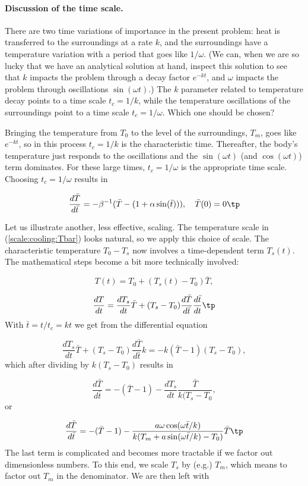 \documentclass[graybox,envcountchap,sectrefs,final]{svmonodo}
\begin{document}
\paragraph{Discussion of the time scale.}
There are two time variations of importance in the present problem:
heat is transferred to the surroundings at a rate $k$, and the
surroundings have a temperature variation with a period that goes like
$1/\omega$. (We can, when we are so lucky that we have an analytical
solution at hand, inspect this solution to see that $k$ impacts the
problem through a decay factor $e^{-kt}$, and $\omega$ impacts the problem
through oscillations $\sin(\omega t)$.)  The $k$ parameter related to
temperature decay points to a time scale $t_c=1/k$, while the
temperature oscillations of the surroundings point to a time scale
$t_c=1/\omega$.  Which one should be chosen?

Bringing the temperature from $T_0$ to the level of the surroundings,
$T_m$, goes like $e^{-kt}$, so in this process $t_c=1/k$ is the
characteristic time. Thereafter, the body's temperature just responds
to the oscillations and the $\sin (\omega t)$ (and $\cos(\omega t)$)
term dominates. For these large times, $t_c=1/\omega$ is the
appropriate time scale. Choosing $t_c=1/\omega$ results in

\begin{equation}
\frac{d\bar T}{d\bar t} = -\beta^{-1}(\bar T - (1 + \alpha\sin (\bar t))),\quad
\bar T(0)=0\tp
\label{scale:cooling:model:scaled2}
\end{equation}


Let us illustrate another, less effective, scaling.
The temperature scale in
(\ref{scale:cooling:Tbar}) looks natural, so we apply this
choice of scale. The characteristic temperature $T_0-T_s$
now involves
a time-dependent term $T_s(t)$. The mathematical steps become a bit
more technically involved:

\[ T(t) = T_0 + (T_s(t)-T_0)\bar T,\]

\[ \frac{dT}{dt} = \frac{dT_s}{dt}\bar T +
(T_s-T_0)\frac{d\bar T}{d\bar t}\frac{d\bar t}{dt}
\tp
\]
With $\bar t = t/t_c = kt$ we get from the differential equation

\[
\frac{dT_s}{dt}\bar T +
(T_s-T_0)\frac{d\bar T}{d\bar t}k
= -k(\bar T - 1)(T_s - T_0),
\]
which after dividing by $k(T_s-T_0)$ results in

\[
\frac{d\bar T}{d\bar t} = -(\bar T - 1) -
\frac{dT_s}{dt}\frac{\bar T}{k(T_s-T_0},
\]
or

\[
\frac{d\bar T}{d\bar t} = -(\bar T - 1) -
\frac{a\omega\cos(\omega \bar t/k)}{k(T_m + a\sin(\omega \bar t/k) -T_0)}\bar T
\tp
\]
The last term is complicated and becomes more tractable if we factor
out dimensionless numbers. To this end, we scale $T_s$ by (e.g.) $T_m$,
which means to factor out $T_m$ in the denominator. We are then
left with
\end{document}

